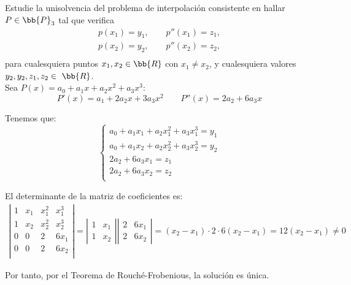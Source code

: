 \begin{ejercicio}
    Estudie la unisolvencia del problema de interpolación consistente en hallar $P\in\bb{P}_3$ tal que verifica
    \begin{gather*}
        p(x_1) = y_1,\qquad p''(x_1)=z_1,\\
        p(x_2) = y_2,\qquad p''(x_2)=z_2,\\
    \end{gather*}
    para cualesquiera puntos $x_1,x_2\in \bb{R}$ con $x_1\neq x_2$, y cualesquiera valores $y_2,y_2,z_1,z_2 \in~\bb{R}$. \\

    Sea $P(x)=a_0+a_1x+a_2x^2+a_3x^3$:
    \begin{equation*}
        P'(x)=a_1+2a_2x+3a_3x^2 \qquad P''(x)=2a_2 +6a_3x    
    \end{equation*}
    
    Tenemos que:
    \begin{equation*}
        \left\{\begin{array}{l}
            a_0+a_1x_1+a_2x_1^2+a_3x_1^3 = y_1 \\
            a_0+a_1x_2+a_2x_2^2+a_3x_2^3 = y_2 \\
            2a_2 +6a_3x_1 = z_1 \\
            2a_2 +6a_3x_2 = z_2 \\
        \end{array}\right.
    \end{equation*}

    El determinante de la matriz de coeficientes es:
    \begin{equation*}\begin{split} \left|
        \begin{array}{cccc}
            1 & x_1 & x_1^2 & x_1^3 \\
            1 & x_2 & x_2^2 & x_2^3 \\
            0 & 0 & 2 & 6x_1 \\
            0 & 0 & 2 & 6x_2 \\
        \end{array}\right|
        = \left|\begin{array}{cc}
            1 & x_1 \\
            1 & x_2
        \end{array}\right|
        \left|\begin{array}{cc}
            2 & 6x_1 \\
            2 & 6x_2
        \end{array}\right| = (x_2-x_1)\cdot 2 \cdot 6(x_2-x_1) = 12(x_2-x_1)\neq 0
    \end{split}\end{equation*}

    Por tanto, por el Teorema de Rouché-Frobenious, la solución es única.
\end{ejercicio}

